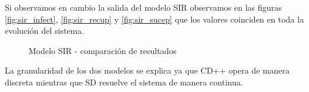 Si observamos en cambio la salida del modelo SIR observamos en las figuras \ref{fig:sir_infect}, \ref{fig:sir_recup} y \ref{fig:sir_sucep} que los valores coinciden en toda la evolución del sistema.

\begin{figure}[H]
    \centering     %
        \caption{Modelo SIR - comparación de resultados}
\end{figure}

La granularidad de los dos modelos se explica ya que CD++ opera de manera discreta mientras que SD resuelve el sistema de manera continua.

